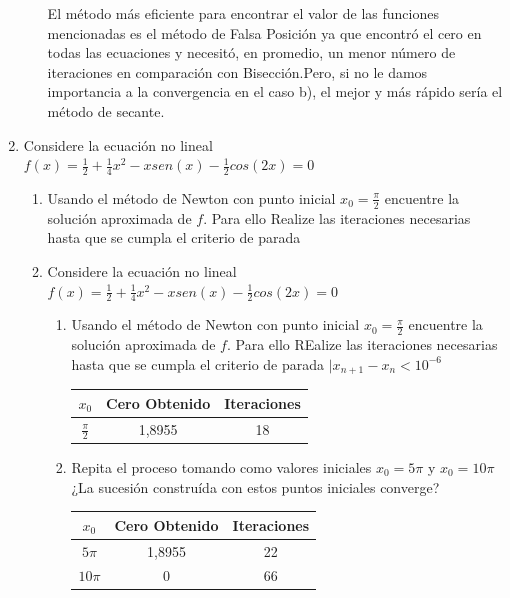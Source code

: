 \documentclass{udpreport}
\begin{document}
\begin{enumerate}
\begin{enumerate}
    El método más eficiente para encontrar el valor de las funciones mencionadas es el método de Falsa Posición ya que encontró el cero en todas las ecuaciones y necesitó, en promedio, un menor número de iteraciones en comparación con Bisección.Pero, si no le damos importancia a la convergencia en el caso b), el mejor y más rápido sería el método de secante.
    
    \end{enumerate}
\newpage
\item Considere la ecuación no lineal $f(x)= \frac{1}{2}+\frac{1}{4}x^2-xsen(x)-\frac{1}{2}cos(2x)=0$
    	\begin{enumerate}
    	\item  Usando el método de Newton con punto inicial $x_{0}=\frac{\pi}{2}$ encuentre la solución aproximada de $f$. Para ello Realize las iteraciones necesarias hasta que se cumpla el criterio de parada %
    
    \item Considere la ecuación no lineal $f(x)= \frac{1}{2}+\frac{1}{4}x^2-xsen(x)-\frac{1}{2}cos(2x)=0$
        	\begin{enumerate}
        	\item  Usando el método de Newton con punto inicial $x_{0}=\frac{\pi}{2}$ encuentre la solución aproximada de $f$. Para ello REalize las iteraciones necesarias hasta que se cumpla el criterio de parada $ |x_{n+1} - x_{n} < 10^{-6} $
        
        		\begin{table} [H]
        			\centering
        			\begin{tabular}{|c|c|c|}
        				\hline
        				$x_{0}$ & Cero Obtenido & Iteraciones\\
        				\hline
        				$\frac{\pi}{2} $ & 1,8955 & 18\\
        				\hline 
        			\end{tabular}
        		\end{table}
        	
        	\item Repita el proceso tomando como valores iniciales $x_{0}=5\pi$ y $x_{0}=10\pi$ ¿La sucesión construída con estos puntos iniciales converge?
        	 	\begin{table} [H]
        			\centering
        			\begin{tabular}{|c|c|c|}
        				\hline
        				$x_{0}$ & Cero Obtenido & Iteraciones\\
        				\hline
        				$5\pi$ & 1,8955 & 22 \\
        				\hline 
        				$10\pi$ & 0 & 66\\
        				\hline
        			\end{tabular}
        		\end{table}
        		

\end{enumerate}
\end{enumerate}
\end{enumerate}
\end{document}

